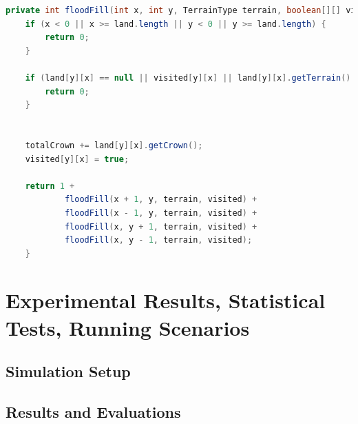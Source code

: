 \documentclass[conference]{IEEEtran}
\begin{document}
\begin{lstlisting}[language=Java, caption={Flood-Fill Algorithm}, label={lst:floodfill}]
private int floodFill(int x, int y, TerrainType terrain, boolean[][] visited) {
    if (x < 0 || x >= land.length || y < 0 || y >= land.length) {
        return 0;
    }

    if (land[y][x] == null || visited[y][x] || land[y][x].getTerrain() != terrain) {
        return 0;
    }
    

    totalCrown += land[y][x].getCrown();
    visited[y][x] = true;

    return 1 +
            floodFill(x + 1, y, terrain, visited) +
            floodFill(x - 1, y, terrain, visited) +
            floodFill(x, y + 1, terrain, visited) +
            floodFill(x, y - 1, terrain, visited);
    }
\end{lstlisting}

\section{Experimental Results, Statistical Tests, Running Scenarios}

\subsection{Simulation Setup}

\subsection{Results and Evaluations}

\end{document}
